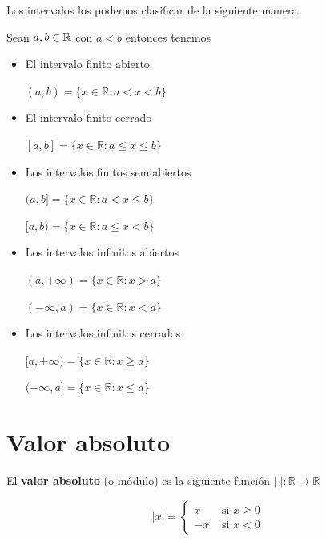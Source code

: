 \begin{observation}
Los intervalos los podemos clasificar de la siguiente manera.  

Sean $a,b \in \mathbb{R}$ con $a<b$ entonces tenemos

\begin{itemize}

\item El intervalo finito abierto 

$(a,b) = \{ x \in \mathbb{R} : a < x < b \}$

\item El intervalo finito cerrado

$[a,b] = \{ x \in \mathbb{R} : a \leq x \leq b \}$

\item Los intervalos finitos semiabiertos

$(a,b] = \{ x \in \mathbb{R} : a < x \leq b \}$

$[a,b) = \{ x \in \mathbb{R} : a \leq x < b \}$

\item Los intervalos infinitos abiertos

$(a, +\infty) = \{ x \in \mathbb{R} : x > a \}$

$(-\infty, a) = \{ x \in \mathbb{R} : x < a \}$

\item Los intervalos infinitos cerrados

$[a, +\infty) = \{ x \in \mathbb{R} : x \geq a \}$

$(-\infty, a] = \{ x \in \mathbb{R} : x \leq a \}$

\end{itemize}
\end{observation}



\section{Valor absoluto}

\begin{definition} \label{funcion_modulo} 
El \textbf{valor absoluto} (o módulo) es la siguiente función $| \cdot | : \mathbb{R} \to \mathbb{R}$

$$ |x| = \begin{cases} x & \textrm{ si } x \geq 0 \\ -x & \textrm{ si } x < 0 \end{cases} $$

\end{definition}

